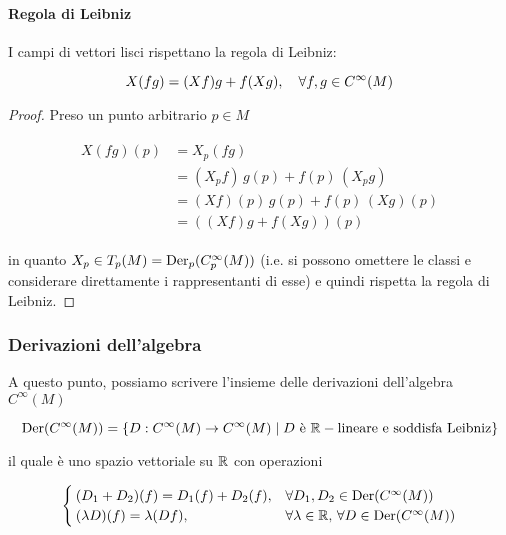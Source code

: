 \paragraph{Regola di Leibniz}

I campi di vettori lisci rispettano la regola di Leibniz:

\begin{equation}
	X(f g) = (X f) g + f (X g) \qcomma \forall f,g \in C^{\infty}(M)
\end{equation}

\begin{proof}
	Preso un punto arbitrario $ p \in M $
	
	\begin{align}
		\begin{split}
			X(f g)(p) &= X_{p}(f g) \\
			&= (X_{p} f) \, g(p) + f(p) \, (X_{p} g) \\
			&= (X f)(p) \, g(p) + f(p) \, (X g)(p) \\
			&= ((X f) g + f (X g))(p)
		\end{split}
	\end{align}
	
	in quanto $ X_{p} \in T_{p}(M) = \operatorname{Der}_{p}(C_{p}^{\infty}(M)) $ (i.e. si possono omettere le classi e considerare direttamente i rappresentanti di esse) e quindi rispetta la regola di Leibniz.
\end{proof}

\subsubsection{Derivazioni dell'algebra}

A questo punto, possiamo scrivere l'insieme delle derivazioni dell'algebra $ C^{\infty}(M) $

\begin{equation}
	\operatorname{Der}(C^{\infty}(M)) = \{ D : C^{\infty}(M) \to C^{\infty}(M) \mid D \text{ è } \mathbb{R}-\text{lineare e soddisfa Leibniz} \}
\end{equation}

il quale è uno spazio vettoriale su $ \mathbb{R} $ con operazioni

\begin{equation}
	\begin{cases}
		(D_{1} + D_{2})(f) = D_{1}(f) + D_{2}(f), & \forall D_{1},D_{2} \in \operatorname{Der}(C^{\infty}(M)) \\
		(\lambda D)(f) = \lambda (D f), & \forall \lambda \in \mathbb{R}, \, \forall D \in \operatorname{Der}(C^{\infty}(M))
	\end{cases}
\end{equation}


